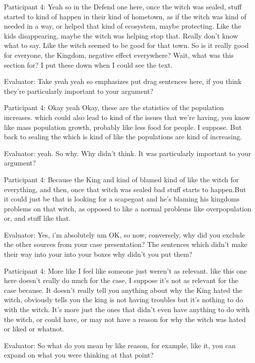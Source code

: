 \documentclass{l4proj}
\begin{document}
\begin{appendices}
 

Participant 4: Yeah so in the Defend one here, once the witch was sealed, stuff started to kind of happen in their kind of hometown, as if the witch was kind of needed in a way, or helped that kind of ecosystem, maybe protecting. Like the kids disappearing, maybe the witch was helping stop that. Really don’t know what to say. Like the witch seemed to be good for that town. So is it really good for everyone, the Kingdom, negative effect everywhere? Wait, what was this section for? I put these down when I could see the text. 

 

Evaluator: Take yeah yeah so emphasizes put drag sentences here, if you think they're particularly important to your argument?

Participant 4: Okay yeah Okay, these are the statistics of the population increases. which could also lead to kind of the issues that we're having, you know like mass population growth, probably like less food for people. I suppose. But back to sealing the which is kind of like the populations are kind of increasing. 

Evaluator: yeah. So why. Why didn't think. It was particularly important to your argument?

Participant 4: Because the King and kind of blamed kind of like the witch for everything, and then, once that witch was sealed bad stuff starts to happen.But it could just be that is looking for a scapegoat and he's blaming his kingdoms problems on that witch, as opposed to like a normal problems like overpopulation or, and stuff like that.

Evaluator: Yes, i'm absolutely um OK, so now, conversely, why did you exclude the other sources from your case presentation? The sentences which didn't make their way into your into your boxes why didn't you put them?

Participant 4: More like I feel like someone just weren't as relevant. like this one here doesn't really  do much for the case, I suppose it's not as relevant for the case because. It doesn't really tell you anything about why the King hated the witch, obviously tells you the king is not having troubles but it's nothing to do with the witch. It’s more just the ones that didn't even have anything to do with the witch, or could have, or may not have a reason for why the witch was hated or liked or whatnot. 

Evaluator: So what do you mean by like reason, for example, like it, you can expand on what you were thinking at that point?


\end{appendices}
\end{document}
